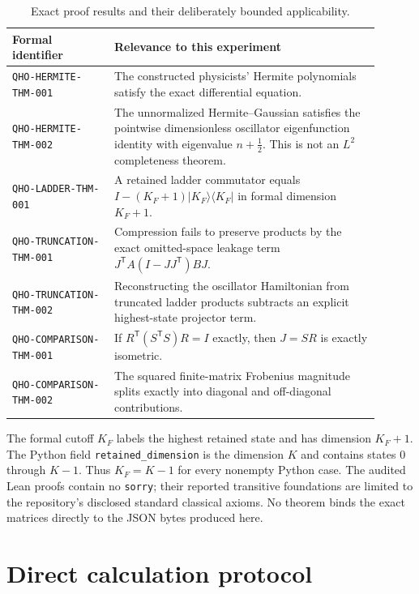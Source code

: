 \documentclass[11pt]{article}
\newcommand{\code}[1]{\texttt{#1}}
\begin{document}
\begin{table}[ht]
\centering
\small
\begin{tabular}{@{}p{0.25\linewidth}p{0.65\linewidth}@{}}
\toprule
Formal identifier & Relevance to this experiment \\
\midrule
\code{QHO-HERMITE-THM-001} & The constructed physicists' Hermite polynomials satisfy
the exact differential equation. \\
\code{QHO-HERMITE-THM-002} & The unnormalized Hermite--Gaussian satisfies the
pointwise dimensionless oscillator eigenfunction identity with eigenvalue
$n+\tfrac12$.  This is not an $L^2$ completeness theorem. \\
\code{QHO-LADDER-THM-001} & A retained ladder commutator equals
$I-(K_{\!F}+1)|K_{\!F}\rangle\langle K_{\!F}|$ in formal dimension $K_{\!F}+1$. \\
\code{QHO-TRUNCATION-THM-001} & Compression fails to preserve products by the exact
omitted-space leakage term $J^{\mathsf T}A(I-JJ^{\mathsf T})BJ$. \\
\code{QHO-TRUNCATION-THM-002} & Reconstructing the oscillator Hamiltonian from
truncated ladder products subtracts an explicit highest-state projector term. \\
\code{QHO-COMPARISON-THM-001} & If
$R^{\mathsf T}(S^{\mathsf T}S)R=I$ exactly, then $J=SR$ is exactly isometric. \\
\code{QHO-COMPARISON-THM-002} & The squared finite-matrix Frobenius magnitude splits
exactly into diagonal and off-diagonal contributions. \\
\bottomrule
\end{tabular}
\caption{Exact proof results and their deliberately bounded applicability.}
\label{tab:formal-crosswalk}
\end{table}

The formal cutoff $K_{\!F}$ labels the highest retained state and has dimension
$K_{\!F}+1$.  The Python field \code{retained\_dimension} is the dimension $K$ and
contains states $0$ through $K-1$.  Thus $K_{\!F}=K-1$ for every nonempty Python case.
The audited Lean proofs contain no \code{sorry}; their reported transitive foundations
are limited to the repository's disclosed standard classical axioms.  No theorem binds
the exact matrices directly to the JSON bytes produced here.

\section{Direct calculation protocol}
\end{document}
